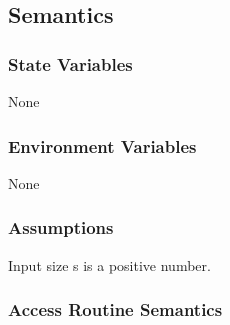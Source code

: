 \documentclass[12pt, titlepage]{article}
\begin{document}
\subsection{Semantics}

\subsubsection{State Variables}
None

\subsubsection{Environment Variables}
None

\subsubsection{Assumptions}
Input size s is a positive number.

\subsubsection{Access Routine Semantics}
\end{document}

